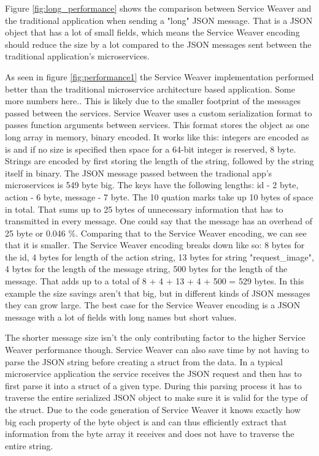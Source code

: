 \documentclass[sigconf,review,9pt]{acmart}
\begin{document}
Figure \ref{fig:long_performance} shows the comparison between Service Weaver and
the traditional application when sending a "long" JSON message.
That is a JSON object that has a lot of small fields, which means the Service Weaver
encoding should reduce the size by a lot compared to the JSON messages sent between
the traditional application's microservices.


As seen in figure \ref{fig:performance1} the Service Weaver implementation performed
better than the traditional microservice architecture based application.
Some more numbers here..
This is likely due to the smaller footprint of the messages passed between the services.
Service Weaver uses a custom serialization format to passes function arguments between services.
This format stores the object as one long array in memory, binary encoded.
It works like this: integers are encoded as is and if no size is specified then
space for a 64-bit integer is reserved, 8 byte.
Strings are encoded by first storing the length of the string, followed by the string
itself in binary.
The JSON message passed between the tradional app's microservices is 549 byte big.
The keys have the following lengths: id - 2 byte, action - 6 byte, message - 7 byte.
The 10 quation marks take up 10 bytes of space in total.
That sums up to 25 bytes of unnecessary information that has to transmitted in every message.
One could say that the message has an overhead of 25 byte or 0.046 \%.
Comparing that to the Service Weaver encoding, we can see that it is smaller.
The Service Weaver encoding breaks down like so: 8 bytes for the id, 4 bytes for length
of the action string, 13 bytes for string "request\_image", 4 bytes for the length
of the message string, 500 bytes for the length of the message.
That adds up to a total of 8 + 4 + 13 + 4 + 500 = 529 bytes.
In this example the size savings aren't that big, but in different kinds of JSON messages
they can grow large.
The best case for the Service Weaver encoding is a JSON message with a lot of fields
with long names but short values.

The shorter message size isn't the only contributing factor to the higher Service Weaver
performance though.
Service Weaver can also save time by not having to parse the JSON string before
creating a struct from the data.
In a typical microservice application the service receives the JSON request and
then has to first parse it into a struct of a given type.
During this parsing process it has to traverse the entire serialized JSON object
to make sure it is valid for the type of the struct.
Due to the code generation of Service Weaver it knows exactly how big each property
of the byte object is and can thus efficiently extract that information from the
byte array it receives and does not have to traverse the entire string.
\end{document}
